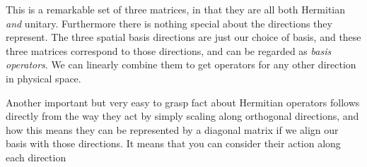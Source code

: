 This is a remarkable set of three matrices, in that they are all both Hermitian \textit{and} unitary. Furthermore there is nothing special about the directions they represent. The three spatial basis directions are just our choice of basis, and these three matrices correspond to those directions, and can be regarded as \textit{basis operators}. We can linearly combine them to get operators for any other direction in physical space.

Another important but very easy to grasp fact about Hermitian operators follows directly from the way they act by simply scaling along orthogonal directions, and how this means they can be represented by a diagonal matrix if we align our basis with those directions. It means that you can consider their action along each direction